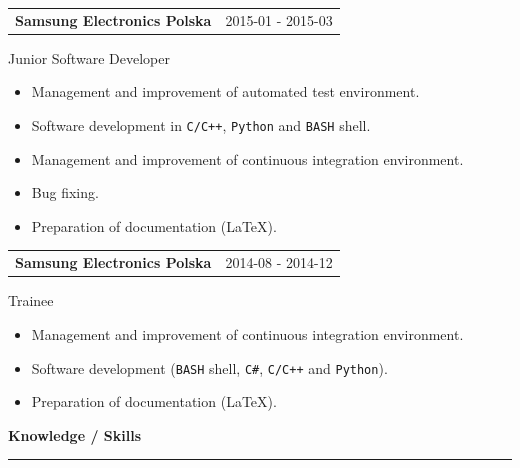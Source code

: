\documentclass{article}
\begin{document}
\begin{tabular}{@{} m{} R{0.37\textwidth} }
\textbf{Samsung Electronics Polska}	& {2015-01 - 2015-03} 
\end{tabular}
Junior Software Developer\\
\begin{itemize}
	\item Management and improvement of automated test environment.
	\item Software development in \texttt{C/C++}, \texttt{Python} and \texttt{BASH} shell.
	\item Management and improvement of continuous integration environment.
	\item Bug fixing.
	\item Preparation of documentation (\LaTeX).
\end{itemize}

\begin{tabular}{@{} m{} R{0.37\textwidth} }
	\textbf{Samsung Electronics Polska}	& {2014-08 - 2014-12} 
\end{tabular}
Trainee\\
\begin{itemize}
	\item Management and improvement of continuous integration environment.
	\item Software development (\texttt{BASH} shell, \texttt{C\#}, \texttt{C/C++} and \texttt{Python}).
	\item Preparation of documentation (\LaTeX). 
\end{itemize}

\textbf{\large Knowledge / Skills}
\vspace{0.005\textheight}
\hrule 

\end{document}
